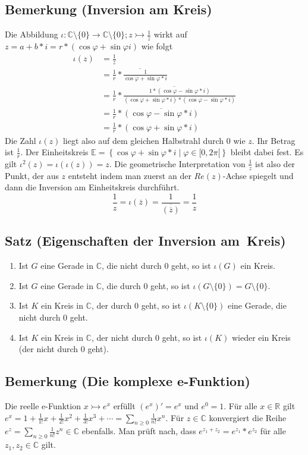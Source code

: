 \subsection{Bemerkung (Inversion am Kreis)}
Die Abbildung $\iota: \mathbb{C} \setminus \{0\} \rightarrow \mathbb{C} \setminus \{0\}; z \rightarrowtail \frac{1}{\overline{z}}$
wirkt auf $z = a+b*i = r*(\cos{\varphi} + \sin{\varphi} i)$ wie folgt
\begin{align*}
\iota(z) &= \frac{1}{\overline{z}} \\
 &= \overline{\frac{1}{r} * \frac{1}{\cos{\varphi}+\sin{\varphi}*i}} \\
 &= \overline{\frac{1}{r} * \frac{1 * (\cos{\varphi}-\sin{\varphi}*i)}{(\cos{\varphi}+\sin{\varphi}*i)*(\cos{\varphi}-\sin{\varphi}*i)}} \\
 &= \frac{1}{r} * \overline{(\cos{\varphi}-\sin{\varphi}*i)} \\
 &= \frac{1}{r} * (\cos{\varphi}+\sin{\varphi}*i)
\end{align*}
Die Zahl $\iota(z)$ liegt also auf dem gleichen Halbstrahl durch 0 wie $z$.
Ihr Betrag ist $\frac{1}{r}$.
Der Einheitskreis $\mathbb{E} = \left\{ \cos{\varphi} + \sin{\varphi}*i \middle| \varphi \in [0, 2\pi[ \right\}$ bleibt dabei fest.
Es gilt $\iota^2(z) = \iota(\iota(z)) = z$.
Die geometrische Interpretation von $\frac{1}{z}$ ist also der Punkt, der aus $z$ entsteht indem man zuerst an der $Re(z)$-Achse spiegelt und dann die Inversion am Einheitskreis durchführt.
\[\frac{1}{z} = \iota (\overline{z}) = \frac{1}{\overline{(\overline{z})}} = \frac{1}{z}\]

\subsection{Satz (Eigenschaften der Inversion am Kreis)}
\begin{enumerate}
\item Ist $G$ eine Gerade in $\mathbb{C}$, die nicht durch 0 geht, so ist $\iota(G)$ ein Kreis.
\item Ist $G$ eine Gerade in $\mathbb{C}$, die durch 0 geht, so ist $\iota(G \setminus \{0\}) = G \setminus \{0\}$.
\item Ist $K$ ein Kreis in $\mathbb{C}$, der durch 0 geht, so ist $\iota(K \setminus \{0\})$ eine Gerade, die nicht durch 0 geht.
\item Ist $K$ ein Kreis in $\mathbb{C}$, der nicht durch 0 geht, so ist $\iota(K)$ wieder ein Kreis (der nicht durch 0 geht).
\end{enumerate}

\subsection{Bemerkung (Die komplexe e-Funktion)}
Die reelle e-Funktion $x \rightarrowtail e^x$ erfüllt $(e^x)' = e^x$ und $e^0=1$.
Für alle $x \in \mathbb{R}$ gilt $e^x = 1+\frac{1}{1!}x+\frac{1}{2!}x^2+\frac{1}{3!}x^3+\cdots = \sum_{n \geq 0} \frac{1}{n!}x^n$.
Für $z \in \mathbb{C}$ konvergiert die Reihe $e^z = \sum_{n \geq 0} \frac{1}{n!}z^n \in \mathbb{C}$ ebenfalls.
Man prüft nach, dass $e^{z_1+z_2} = e^{z_1} * e^{z_2}$ für alle $z_1, z_2 \in \mathbb{C}$ gilt.


